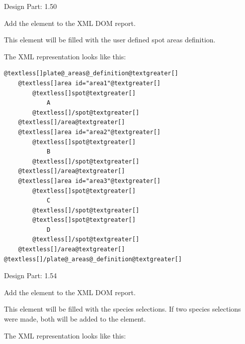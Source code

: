 \documentclass[letterpaper,10pt,english]{sphinxmanual}
\begin{document}
\begin{fulllineitems}
\begin{fulllineitems}
Design Part: 1.50

\end{fulllineitems}


\begin{fulllineitems}
\label{setlyze/std:setlyze.std.ReportGenerator.set_plate_areas_definition}
Add the element  to the XML DOM
report.

This element will be filled with the user defined spot areas
definition.

The XML representation looks like this:

\begin{Verbatim}[commandchars=@\[\]]
@textless[]plate@_areas@_definition@textgreater[]
    @textless[]area id="area1"@textgreater[]
        @textless[]spot@textgreater[]
            A
        @textless[]/spot@textgreater[]
    @textless[]/area@textgreater[]
    @textless[]area id="area2"@textgreater[]
        @textless[]spot@textgreater[]
            B
        @textless[]/spot@textgreater[]
    @textless[]/area@textgreater[]
    @textless[]area id="area3"@textgreater[]
        @textless[]spot@textgreater[]
            C
        @textless[]/spot@textgreater[]
        @textless[]spot@textgreater[]
            D
        @textless[]/spot@textgreater[]
    @textless[]/area@textgreater[]
@textless[]/plate@_areas@_definition@textgreater[]
\end{Verbatim}

Design Part: 1.54

\end{fulllineitems}


\begin{fulllineitems}
\label{setlyze/std:setlyze.std.ReportGenerator.set_specie_selections}
Add the element  to the XML DOM
report.

This element will be filled with the species selections. If
two species selections were made, both will be added to the
element.

The XML representation looks like this:


\end{fulllineitems}
\end{fulllineitems}
\end{document}
